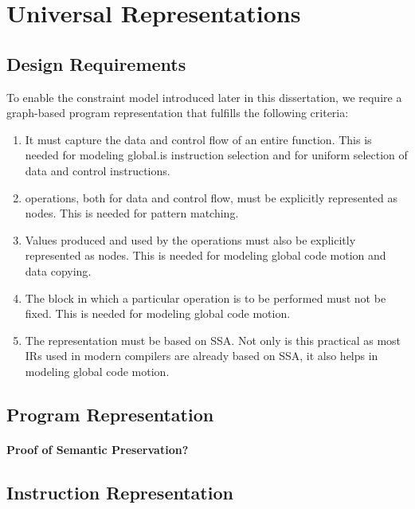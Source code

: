 %

\chapter{Universal Representations}




\section{Design Requirements}

To enable the \gls{constraint model} introduced later in this dissertation, we
require a \gls{graph}-based \gls{program} representation that fulfills the
following criteria:
%
\begin{enumerate}
  \item It must capture the data and control flow of an entire \gls{function}.
    This is needed for modeling \gls{global.is} \gls{instruction selection}
    and for uniform selection of data and control \glspl{instruction}.
  \item \Glspl{operation}, both for data and control flow, must be explicitly
    represented as \glspl{node}.
    This is needed for \gls{pattern matching}.
  \item Values produced and used by the \glspl{operation} must also be
    explicitly represented as \glspl{node}.
    This is needed for modeling \gls{global code motion} and \gls{data copying}.
  \item The \gls{block} in which a particular \gls{operation} is to be performed
    must not be fixed.
    This is needed for modeling \gls{global code motion}.
  \item The representation must be based on \gls{SSA}.
    Not only is this practical as most \glspl{IR} used in modern
    \glspl{compiler} are already based on \gls{SSA}, it also helps in modeling
    \gls{global code motion}.
\end{enumerate}




\section{Program Representation}




\subsubsection{Proof of Semantic Preservation?}




\section{Instruction Representation}

